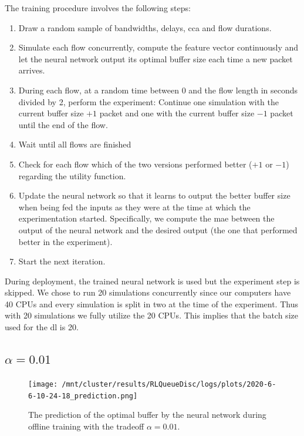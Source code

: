 \documentclass[conference]{IEEEtran}
\begin{document}
The training procedure involves the following steps:
\begin{enumerate}
\item Draw a random sample of bandwidths, delays, \gls{cca} and flow durations.
\item Simulate each flow concurrently, compute the feature vector continuously and let the neural network output its optimal buffer size each time a new packet arrives. 
\item During each flow, at a random time between 0 and the flow length in seconds divided by 2, perform the experiment: Continue one simulation with the current buffer size $+1$ packet and one with the current buffer size $-1$ packet until the end of the flow. 
\item Wait until all flows are finished
\item Check for each flow which of the two versions performed better ($+1$ or $-1$) regarding the utility function.
\item Update the neural network so that it learns to output the better buffer size when being fed the inputs as they were at the time at which the experimentation started. Specifically, we compute the \gls{mae} between the output of the neural network and the desired output (the one that performed better in the experiment).
\item Start the next iteration. 
\end{enumerate}

During deployment, the trained neural network is used but the experiment step is skipped. We chose to run 20 simulations concurrently since our computers have 40 CPUs and every simulation is split in two at the time of the experiment. Thus with 20 simulations we fully utilize the 20 CPUs. This implies that the batch size used for the \gls{dl} is 20. 

\subsection{$\alpha=0.01$}

\begin{figure}[h]
\texttt{[image: /mnt/cluster/results/RLQueueDisc/logs/plots/2020-6-6-10-24-18\_prediction.png]}
\caption{The prediction of the optimal buffer by the neural network during offline training with the tradeoff $\alpha=0.01$.}
\label{fig:offlineTraining}
\end{figure}
\end{document}
